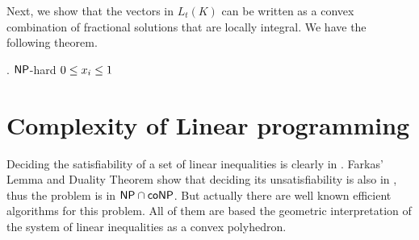 \documentclass[a4paper,twoside,justified]{tufte-handout}
\begin{document}
Next, we show that the vectors in $L_t(K)$ can be written as a convex
combination of fractional solutions that are locally integral. 
We have the following theorem.
\begin{theorem}\label{thm:local-integral-solution}

\end{theorem}


. 
$ \mathsf{NP} $-hard 
\eg
$ \varbounded{x_{i}} $
\section{Complexity of Linear programming}

Deciding the satisfiability of a set of linear inequalities is clearly
in \NP.
% 
Farkas' Lemma and Duality Theorem show that deciding its
unsatisfiability is also in \NP, thus the problem is in $ \mathsf{NP} \cap \mathsf{coNP}
$. But actually there are well known efficient algorithms for this
problem. All of them are based the geometric interpretation of the
system of linear inequalities as a convex polyhedron.
\end{document}
